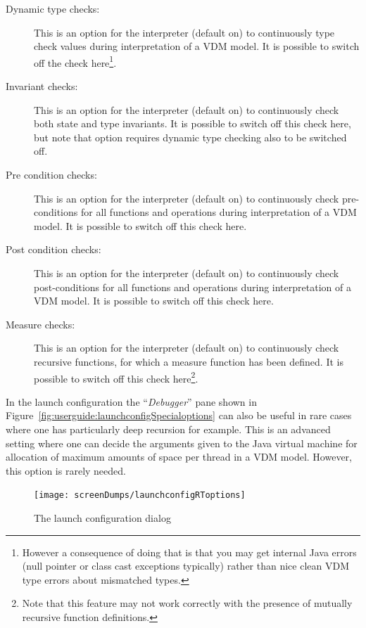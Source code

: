 \documentclass{overturerepchap}
\begin{document}
\begin{description}
\item[Dynamic type checks:] This is an option for the interpreter (default on)
  to continuously type check  values during interpretation of a VDM model.
  It is possible to switch off the check here\footnote{However a consequence of doing that is that you may get internal Java errors (null pointer or class cast exceptions typically) rather than nice clean VDM type errors about mismatched types.}.
\item[Invariant checks:] This is an option for the interpreter (default on)
  to continuously check both state and type invariants.
  It is possible to switch off
  this check here, but note that option requires dynamic type
  checking also to be switched off.
\item[Pre condition checks:] This is an option for the interpreter (default on)
  to continuously check pre-conditions for all functions and operations
  during interpretation of a VDM model. It is possible to switch off
  this check here.
\item[Post condition checks:] This is an option for the interpreter (default on)
  to continuously check post-conditions for all functions and operations
  during interpretation of a VDM model. It is possible to switch off
  this check here.
\item[Measure checks:] This is an option for the interpreter (default
  on) to continuously check recursive functions, for which a
  measure function has been defined. It is possible to switch off this
  check here\footnote{Note that this feature may not work correctly with the 
presence of mutually recursive function definitions.}.
\end{description}

In the launch
configuration the ``\emph{Debugger}'' pane shown in
Figure~\ref{fig:userguide:launchconfigSpecialoptions} can also be
useful in rare cases where one has particularly deep recursion for
example. This is an advanced setting where one can decide the
arguments given to the Java virtual machine for allocation of maximum
amounts of space per thread in a VDM model. However, this option is
rarely needed.

\begin{figure}[htp]
\begin{center}
  \texttt{[image: screenDumps/launchconfigRToptions]}
  \caption{The launch configuration dialog}
  \label{fig:userguide:launchconfigRToptions}
\end{center}
\end{figure}
\end{document}
